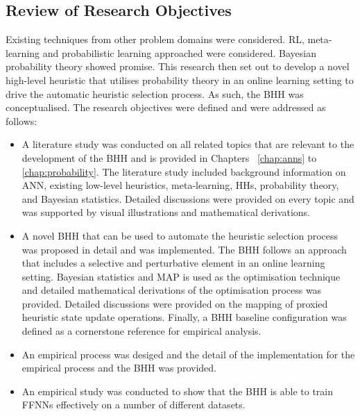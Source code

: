 \subsection{Review of Research Objectives}
\label{sec:conclusion:research_goals:research_objectives}

Existing techniques from other problem domains were considered. \acs{RL}, meta-learning and probabilistic learning approached were considered. Bayesian probability theory showed promise. This research then set out to develop a novel high-level heuristic that utilises probability theory in an online learning setting to drive the automatic heuristic selection process. As such, the \acs{BHH} was conceptualised. The research objectives were defined and were addressed as follows:

\begin{itemize}
      \item A literature study was conducted on all related topics that are relevant to the development of the \acs{BHH} and is provided in Chapters ~\ref{chap:anns} to \ref{chap:probability}. The literature study included background information on \acs{ANN}, existing low-level heuristics, meta-learning, \acp{HH}, probability theory, and Bayesian statistics. Detailed discussions were provided on every topic and was supported by visual illustrations and mathematical derivations.

      \item A novel \acs{BHH} that can be used to automate the heuristic selection process was proposed in detail and was implemented. The \acs{BHH} follows an approach that includes a selective and perturbative element in an online learning setting. Bayesian statistics and \acs{MAP} is used as the optimisation technique and detailed mathematical derivations of the optimisation process was provided. Detailed discussions were provided on the mapping of proxied heuristic state update operations. Finally, a \acs{BHH} baseline configuration was defined as a cornerstone reference for empirical analysis.

      \item An empirical process was desiged and the detail of the implementation for the empirical process and the \acs{BHH} was provided.

      \item An empirical study was conducted to show that the \ac{BHH} is able to train \acp{FFNN} effectively on a number of different datasets.


\end{itemize}
